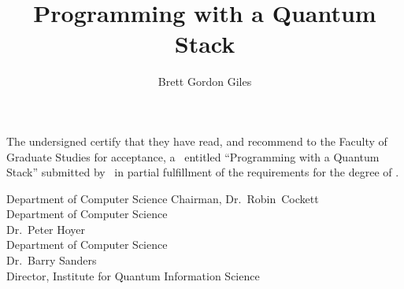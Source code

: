 \documentclass[oneside]{ucalgthes}
\title{Programming with a Quantum Stack}
\author{Brett Gordon Giles}
\newcommand{\thesistitle}{Programming with a Quantum Stack}
\begin{document}
\makethesistitle
\clearpage
{}
\setcounter{page}{2}
\pagestyle{plain}
The undersigned certify that they have read, and recommend
to the Faculty of Graduate Studies for acceptance, a \Thesis\ entitled
``\thesistitle'' submitted by \Author\
in partial fulfillment of the requirements for the degree of
\Degree.

%
%
\begin{signing}{Department of Computer Science}
\signline
Chairman, Dr.~Robin~Cockett \\
Department of Computer Science \\
\signline
Dr.~Peter Hoyer \\
Department of Computer Science  \\
\signline
Dr.~Barry Sanders \\
Director, Institute for Quantum Information Science\\
\end{signing}




\begin{singlespace}
\tableofcontents{}
\listoftables
\listoffigures
\end{singlespace}
\clearpage
%
\pagestyle{myheadings}

\end{document}
